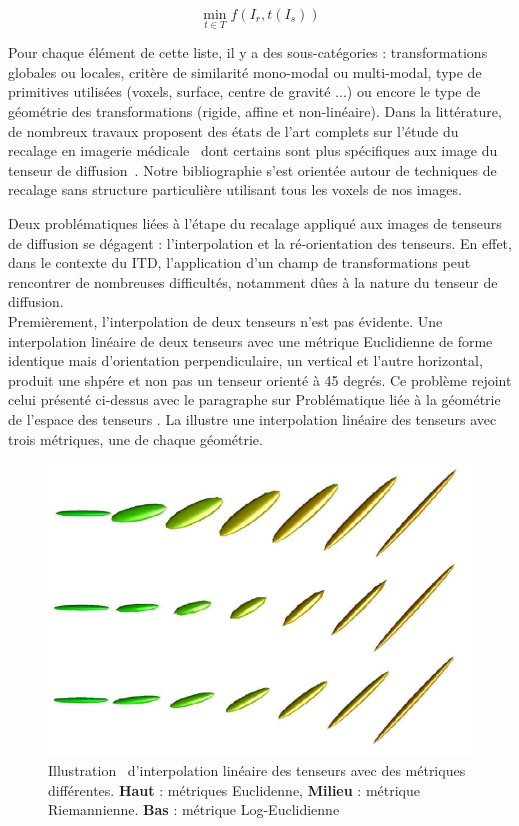 \begin{equation}
    \min_{t \in T} f(I_r, t(I_s) )
    \label{eq_recalage}
\end{equation}

Pour chaque élément de cette liste, il y a des sous-catégories : transformations globales ou locales, critère de similarité mono-modal ou multi-modal, type de primitives utilisées (voxels, surface, centre de gravité ...) ou encore le type de géométrie des transformations (rigide, affine et non-linéaire).
Dans la littérature, de nombreux travaux proposent des états de l'art complets sur l'étude du recalage en imagerie 
médicale~\cite{Noblet_PhD,Klein2009,Sotiras2013,Oliviera2014} dont certains sont plus spécifiques aux image du tenseur de diffusion~\cite{Zhang2007,Wang2011,Schwarz2014}.
Notre bibliographie s'est orientée autour de techniques de recalage sans structure particulière utilisant tous les voxels de nos images.

Deux problématiques liées à l'étape du recalage appliqué aux images de tenseurs de diffusion se dégagent : l'interpolation et la ré-orientation des tenseurs.
En effet, dans le contexte du ITD, l'application d'un champ de transformations peut rencontrer de nombreuses difficultés, notamment dûes à la nature du tenseur de diffusion.\\

Premièrement, l'interpolation de deux tenseurs n'est pas évidente. 
Une interpolation linéaire de deux tenseurs avec une métrique Euclidienne de forme identique mais d'orientation perpendiculaire, 
un vertical et l'autre horizontal, produit une shpére et non pas un tenseur orienté à 45 degrés.
Ce problème rejoint celui présenté ci-dessus avec le paragraphe sur \og Problématique liée à la géométrie de l'espace des tenseurs \fg.
La  illustre une interpolation linéaire des tenseurs avec trois métriques, une de chaque géométrie.\\
\begin{figure}[htpb]
    \centering
    \includegraphics[scale=0.8]{Images/interpolation_arsigny.pdf}
    \caption{\label{fig_interpolation} Illustration~\cite{Arsigny2005} d'interpolation linéaire des tenseurs avec des métriques différentes. \textbf{Haut} : métriques Euclidenne, \textbf{Milieu} : métrique Riemannienne. \textbf{Bas} : métrique Log-Euclidienne}
\end{figure}

